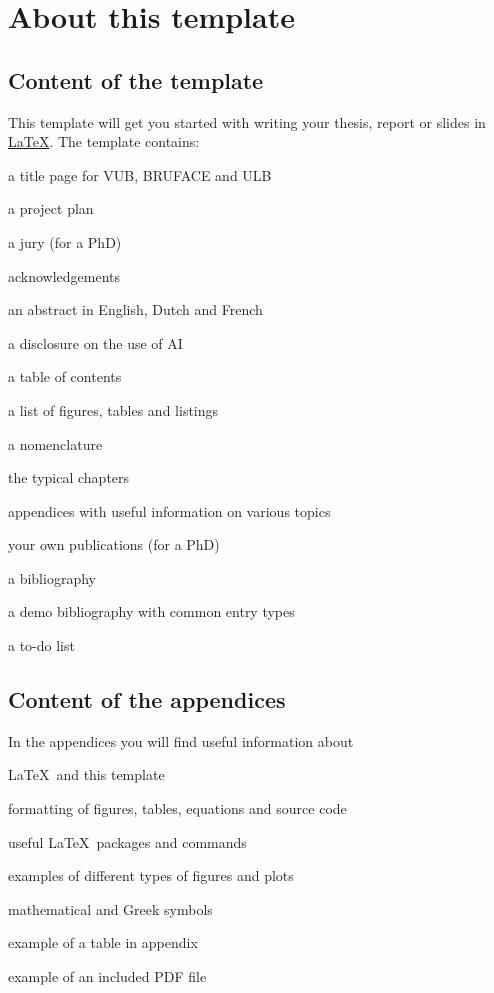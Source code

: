 \section{About this template}
\subsection{Content of the template}
This template will get you started with writing your thesis, report or slides in \href{https://www.latex-project.org}{\LaTeX}. The template contains:
\begin{itemshort}
    \item a title page for VUB, BRUFACE and ULB
    \item a project plan
    \item a jury (for a PhD)
    \item acknowledgements
    \item an abstract in English, Dutch and French
    \item a disclosure on the use of AI
    \item a table of contents
    \item a list of figures, tables and listings
    \item a nomenclature
    \item the typical chapters
    \item appendices with useful information on various topics
    \item your own publications (for a PhD)
    \item a bibliography
    \item a demo bibliography with common entry types
    \item a to-do list
\end{itemshort}

\subsection{Content of the appendices}
In the appendices you will find useful information about
\begin{itemshort}
    \item \LaTeX\ and this template
    \item formatting of figures, tables, equations and source code
    \item useful \LaTeX\ packages and commands
    \item examples of different types of figures and plots
    \item mathematical and Greek symbols
    \item example of a table in appendix
    \item example of an included PDF file
\end{itemshort}

